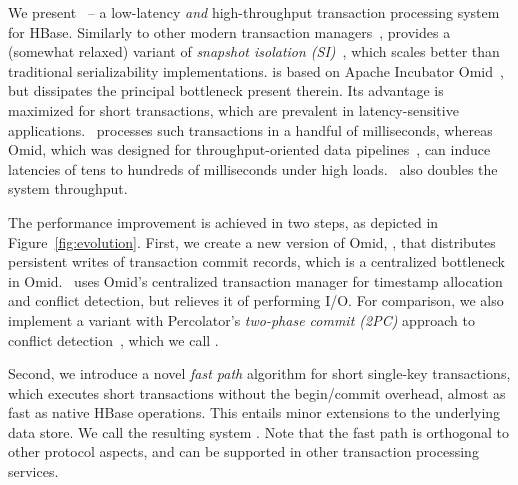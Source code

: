 We present {\sys\/}~-- a low-latency {\em and\/} high-throughput transaction processing system for HBase. 
Similarly to other modern transaction managers~\cite{Percolator2010,Spanner2012,Omid2017,tephra,cockroach},
{\sys\/} provides a (somewhat relaxed) variant of \emph{snapshot isolation (SI)}~\cite{DBLP:conf/sigmod/BerensonBGMOO95},
which scales better than traditional serializability implementations. 
{\sys\/} is based on Apache Incubator Omid~\cite{omid}, but dissipates the principal bottleneck present therein.
Its advantage is maximized for short  transactions, which are prevalent in latency-sensitive applications.
\sys\ processes  such transactions in a handful of milliseconds, whereas Omid, 
which was designed for throughput-oriented data pipelines~\cite{Omid2017}, 
can induce latencies of tens to hundreds of milliseconds under high loads. 
\sys\ also doubles the system throughput.

The performance improvement  is achieved in two steps, as depicted in Figure~\ref{fig:evolution}.  
First, we create a new version of Omid, \sysll, that 
distributes persistent writes of transaction commit records, which is a centralized bottleneck in Omid. 
\sysll\ uses Omid's centralized transaction manager for timestamp allocation and conflict detection, 
but relieves it of performing I/O. 
For comparison, we also implement a variant with Percolator's \emph{two-phase commit (2PC)} approach to 
conflict detection~\cite{Percolator2010}, which we call \syspc. 
  
Second, we introduce a novel \emph{fast path} algorithm for short single-key transactions, which 
executes short transactions without the begin/commit overhead, 
 almost as fast as native HBase operations. This entails minor extensions to the underlying 
data store. We call the resulting system \sys. Note that
the fast path is orthogonal to other protocol aspects, and can be supported in other 
transaction processing services. 

